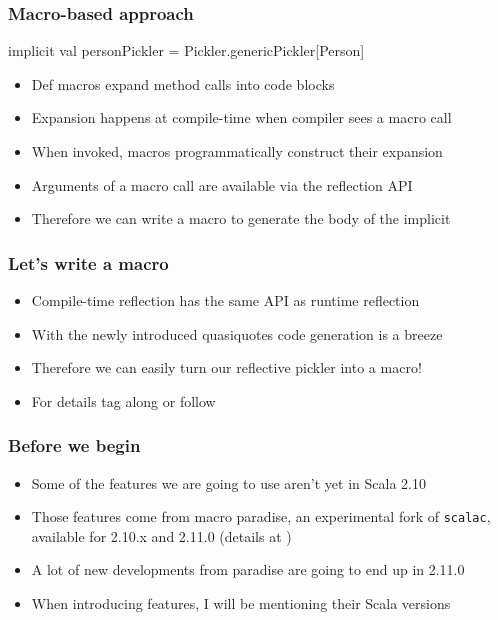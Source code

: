 \documentclass[svgnames,hyperref={bookmarks=false}]{beamer}
\begin{document}
\begin{frame}[fragile]
\frametitle{Macro-based approach}

\begin{semiverbatim}
implicit val personPickler = \alert{Pickler.genericPickler[Person]}




\end{semiverbatim}

\begin{itemize}
\item Def macros expand method calls into code blocks
\item Expansion happens at compile-time when compiler sees a macro call
\item When invoked, macros programmatically construct their expansion
\item Arguments of a macro call are available via the reflection API
\item Therefore we can write a macro to generate the body of the implicit
\end{itemize}
\end{frame}

\begin{frame}[fragile]
\frametitle{Let's write a macro}

\begin{itemize}
\item Compile-time reflection has the same API as runtime reflection
\item With the newly introduced quasiquotes code generation is a breeze
\item Therefore we can easily turn our reflective pickler into a macro!
\item For details tag along or follow
\end{itemize}
\end{frame}

\begin{frame}[fragile]
\frametitle{Before we begin}

\begin{itemize}
\item Some of the features we are going to use aren't yet in Scala 2.10
\item Those features come from macro paradise, an experimental fork of \texttt{scalac}, available for 2.10.x and 2.11.0
(details at )
\item A lot of new developments from paradise are going to end up in 2.11.0
\item When introducing features, I will be mentioning their Scala versions
\end{itemize}
\end{frame}
\end{document}
